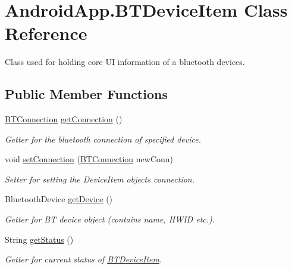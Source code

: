 \hypertarget{class_android_app_1_1_b_t_device_item}{}\section{Android\+App.\+B\+T\+Device\+Item Class Reference}
\label{class_android_app_1_1_b_t_device_item}


Class used for holding core UI information of a bluetooth devices.  


\subsection*{Public Member Functions}
\begin{DoxyCompactItemize}
\item 
\hyperlink{class_android_app_1_1_b_t_connection}{B\+T\+Connection} \hyperlink{class_android_app_1_1_b_t_device_item_af256e53bf23dd3f969b14e0566a7b785}{get\+Connection} ()
\begin{DoxyCompactList}\small\item\em Getter for the bluetooth connection of specified device. \end{DoxyCompactList}\item 
void \hyperlink{class_android_app_1_1_b_t_device_item_a7fa3ffc652503e2a767e6cfb74a2fe55}{set\+Connection} (\hyperlink{class_android_app_1_1_b_t_connection}{B\+T\+Connection} new\+Conn)
\begin{DoxyCompactList}\small\item\em Setter for setting the Device\+Item object\textquotesingle{}s connection. \end{DoxyCompactList}\item 
Bluetooth\+Device \hyperlink{class_android_app_1_1_b_t_device_item_a2e8577754ccc57fb1d9e94f818d41151}{get\+Device} ()
\begin{DoxyCompactList}\small\item\em Getter for BT device object (contains name, H\+W\+ID etc.). \end{DoxyCompactList}\item 
String \hyperlink{class_android_app_1_1_b_t_device_item_a5a27acd244054ade34a6acd4a311e028}{get\+Status} ()
\begin{DoxyCompactList}\small\item\em Getter for current status of \hyperlink{class_android_app_1_1_b_t_device_item}{B\+T\+Device\+Item}. \end{DoxyCompactList}\item 

\end{DoxyCompactItemize}
